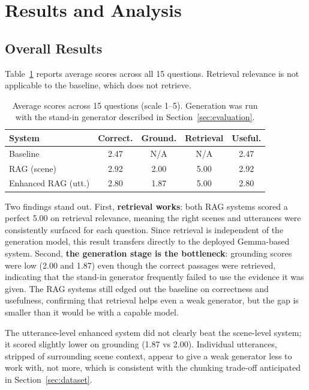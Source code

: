 \section{Results and Analysis}
\label{sec:results}

\subsection{Overall Results}
Table~\ref{tab:results-summary} reports average scores across all 15
questions. Retrieval relevance is not applicable to the baseline, which
does not retrieve.

\begin{table}[ht]
\centering
\caption{Average scores across 15 questions (scale 1--5). Generation was
run with the stand-in generator described in
Section~\ref{sec:evaluation}.}
\label{tab:results-summary}
\begin{tabular}{lcccc}
\toprule
System & Correct. & Ground. & Retrieval & Useful. \\
\midrule
Baseline           & 2.47 & N/A  & N/A  & 2.47 \\
RAG (scene)        & 2.92 & 2.00 & 5.00 & 2.92 \\
Enhanced RAG (utt.)& 2.80 & 1.87 & 5.00 & 2.80 \\
\bottomrule
\end{tabular}
\end{table}

Two findings stand out. First, \textbf{retrieval works}: both RAG systems
scored a perfect 5.00 on retrieval relevance, meaning the right scenes
and utterances were consistently surfaced for each question. Since
retrieval is independent of the generation model, this result transfers
directly to the deployed Gemma-based system. Second, \textbf{the
generation stage is the bottleneck}: grounding scores were low (2.00 and
1.87) even though the correct passages were retrieved, indicating that
the stand-in generator frequently failed to use the evidence it was
given. The RAG systems still edged out the baseline on correctness and
usefulness, confirming that retrieval helps even a weak generator, but
the gap is smaller than it would be with a capable model.

The utterance-level enhanced system did not clearly beat the scene-level
system; it scored slightly lower on grounding (1.87 vs 2.00). Individual
utterances, stripped of surrounding scene context, appear to give a weak
generator less to work with, not more, which is consistent with the
chunking trade-off anticipated in Section~\ref{sec:dataset}.

